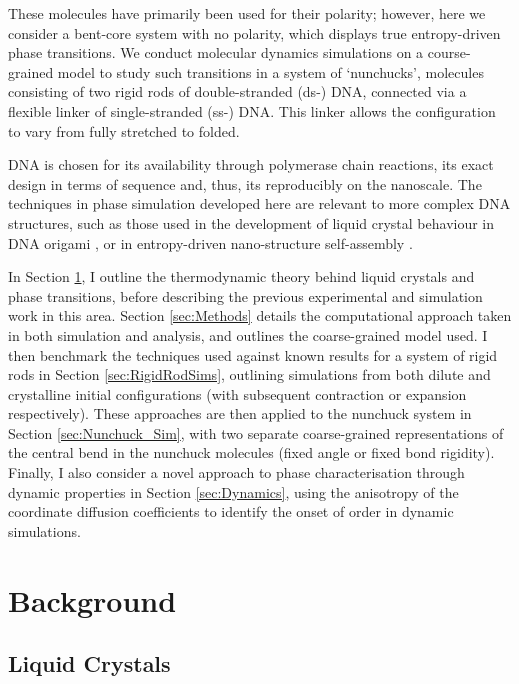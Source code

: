 \documentclass[11pt, a4paper]{article} %
\begin{document}
These molecules have primarily been used for their polarity; however, here we consider a bent-core system with no polarity, which displays true entropy-driven phase transitions. We conduct molecular dynamics simulations on a course-grained model to study such transitions in a system of ‘nunchucks’, molecules consisting of two rigid rods of double-stranded (ds-) DNA, connected via a flexible linker of single-stranded (ss-) DNA. This linker allows the configuration to vary from fully stretched to folded. 

DNA is chosen for its availability through polymerase chain reactions, its exact design in terms of sequence and, thus, its reproducibly on the nanoscale. The techniques in phase simulation developed here are relevant to more complex DNA structures, such as those used in the development of liquid crystal behaviour in DNA origami \cite{Cha2015,Wang2018}, or in entropy-driven nano-structure self-assembly \cite{Barry2010, Lin2000}.

In Section \ref{sec:Background}, I outline the thermodynamic theory behind liquid crystals and phase transitions, before describing the previous experimental and simulation work in this area. Section \ref{sec:Methods} details the computational approach taken in both simulation and analysis, and outlines the coarse-grained model used. I then benchmark the techniques used against known results for a system of rigid rods in Section \ref{sec:RigidRodSims}, outlining simulations from both dilute and crystalline initial configurations (with subsequent contraction or expansion respectively). These approaches are then applied to the nunchuck system in Section \ref{sec:Nunchuck_Sim}, with two separate coarse-grained representations of the central bend in the nunchuck molecules (fixed angle or fixed bond rigidity). Finally, I also consider a novel approach to phase characterisation through dynamic properties in Section \ref{sec:Dynamics}, using the anisotropy of the coordinate diffusion coefficients to identify the onset of order in dynamic simulations.


\section{Background} \label{sec:Background}
\subsection{Liquid Crystals}
\end{document}

